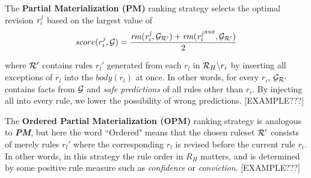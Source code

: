 The \textbf{Partial Materialization (PM)} ranking strategy selects the optimal revision $\mathit{r^j_i}$ based on the largest value of
\begin{equation}
\label{pm}
score(r^j_i,\mathcal{G})=\dfrac{\mathit{rm(r^j_i,\mathcal{G}_{\mathcal{R}'})+rm({r^j_i}^{aux},\mathcal{G}_{\mathcal{R}'})}}{2}
\end{equation}

where $\mathcal{R}'$ contains rules $r_l'$ generated from each $r_l$ in $\mathcal{R}_H\backslash r_i$ by inserting all exceptions of $r_l$ into the $body(r_l)$ at once. In other words, for every $r_i$, $\mathcal{G}_{\mathcal{R}'}$ contains facts from $\mathcal{G}$ and \textit{safe predictions} of all rules other than $r_i$. By injecting all into every rule, we lower the possibility of wrong predictions. [EXAMPLE???]

The \textbf{Ordered Partial Materialization (OPM)} ranking strategy is analogous to \textbf{\emph{PM}}, but here the word ``Ordered" means that the chosen ruleset $\mathcal{R}'$ consists of merely rules $r_l'$ where the corresponding $r_l$ is revised before the current rule $r_i$. In other words, in this strategy the rule order in $R_H$ matters, and is determined by some positive rule measure such as \textit{confidence} or \textit{conviction}. [EXAMPLE???]